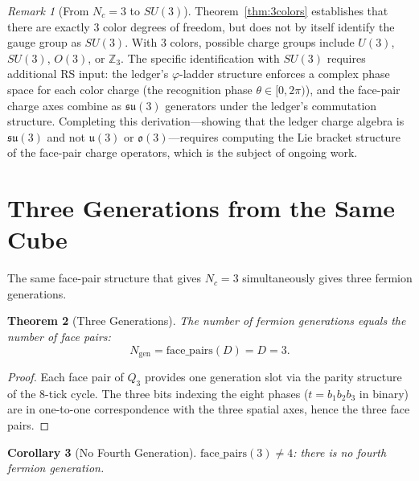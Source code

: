 \documentclass[12pt,a4paper]{article}
\newtheorem{theorem}{Theorem}[section]
\newtheorem{corollary}[theorem]{Corollary}
\theoremstyle{definition}
\theoremstyle{remark}
\newtheorem{remark}[theorem]{Remark}
\begin{document}
\begin{remark}[From $N_c = 3$ to $SU(3)$]
Theorem~\ref{thm:3colors} establishes that there are exactly 3 color
degrees of freedom, but does not by itself identify the gauge group as
$SU(3)$.  With 3 colors, possible charge groups include $U(3)$,
$SU(3)$, $O(3)$, or $\mathbb{Z}_3$.  The specific identification with
$SU(3)$ requires additional RS input: the ledger's $\varphi$-ladder
structure enforces a complex phase space for each color charge (the
recognition phase $\theta \in [0, 2\pi)$), and the face-pair charge
axes combine as $\mathfrak{su}(3)$ generators under the ledger's
commutation structure.  Completing this derivation---showing that the
ledger charge algebra is $\mathfrak{su}(3)$ and not $\mathfrak{u}(3)$
or $\mathfrak{o}(3)$---requires computing the Lie bracket structure of
the face-pair charge operators, which is the subject of ongoing work.
\end{remark}

\section{Three Generations from the Same Cube}
\label{sec:generations}

The same face-pair structure that gives $N_c = 3$ simultaneously
gives three fermion generations.

\begin{theorem}[Three Generations]
\label{thm:3gen}
The number of fermion generations equals the number of face pairs:
\begin{equation}
  N_{\mathrm{gen}} = \mathrm{face\_pairs}(D) = D = 3.
\end{equation}
\end{theorem}

\begin{proof}
Each face pair of $Q_3$ provides one generation slot via the
parity structure of the 8-tick cycle.  The three bits indexing the
eight phases ($t = b_1 b_2 b_3$ in binary) are in one-to-one
correspondence with the three spatial axes, hence the three face pairs.
\end{proof}

\begin{corollary}[No Fourth Generation]
\label{cor:no4th}
$\mathrm{face\_pairs}(3) \neq 4$: there is no fourth fermion
generation.
\end{corollary}
\end{document}
